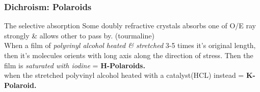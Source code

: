 \documentclass[legalpaper,10pt]{article}
\begin{document}
\begin{multicols*}{2}
	\subsubsection*{Dichroism: Polaroids}
	The selective absorption Some doubly refractive crystals absorbs one of O/E ray strongly \& allows other to pass by. (tourmaline) \\
	\indent When a film of\textit{ polyvinyl alcohol} \textit{heated \& stretched} 3-5 times it's original length, then it's molecules orients with long axis along the direction of stress. Then the film is \textit{saturated with iodine} =\textbf{ H-Polaroids.}\\
	\indent when the stretched polyvinyl alcohol heated with a catalyst(HCL) instead = \textbf{K-Polaroid.}


\end{multicols*}
\end{document}
